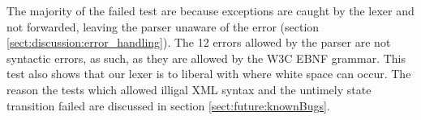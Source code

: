 The majority of the failed test are because exceptions are caught by the lexer and not forwarded, leaving the parser unaware of the error (section \ref{sect:discussion:error_handling}). The 12 errors allowed by the parser are not syntactic errors, as such, as they are allowed by the W3C EBNF grammar. This test also shows that our lexer is to liberal with where white space can occur. The reason the tests which allowed illigal XML syntax and the untimely state transition failed are discussed in section \ref{sect:future:knownBugs}.
